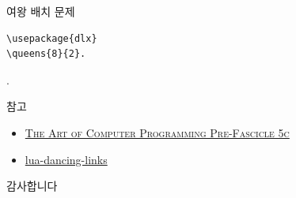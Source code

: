 \documentclass[xcolor=svgnames]{beamer}
\begin{document}
%
\begin{frame}[fragile]{여왕 배치 문제}
\begin{verbatim}
\usepackage{dlx}
\queens{8}{2}.
\end{verbatim}
\vspace{-10mm}
.
\end{frame}


%
\begin{frame}{참고}
  \begin{itemize}
  \item \href{http://www-cs-faculty.stanford.edu/~knuth/fasc5c.ps.gz}
    {\textsc{The Art of Computer Programming Pre-Fascicle 5c}}
  \item \href{https://github.com/sjnam/lua-dancing-links}
    {lua-dancing-links}
  \end{itemize}
\end{frame}

%
\begin{frame}[standout]
  감사합니다
\end{frame}
\end{document}
